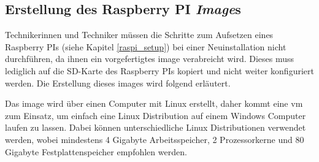 \subsection{Erstellung des Raspberry PI \textit{Image}s}
Technikerinnen und Techniker müssen die Schritte zum Aufsetzen eines Raspberry PIs (siehe Kapitel \ref{raspi_setup}) bei einer Neuinstallation nicht durchführen, da ihnen ein vorgefertigtes \gls{image} verabreicht wird. Dieses muss lediglich auf die SD-Karte des Raspberry PIs kopiert und nicht weiter konfiguriert werden. Die Erstellung dieses \gls{image}s wird folgend erläutert.

Das \gls{image} wird über einen Computer mit Linux erstellt, daher kommt eine \ac{vm} zum Einsatz, um einfach eine Linux Distribution auf einem Windows Computer laufen zu lassen. Dabei können unterschiedliche Linux Distributionen verwendet werden, wobei mindestens 4 Gigabyte Arbeitsspeicher, 2 Prozessorkerne und 80 Gigabyte Festplattenspeicher empfohlen werden. 

